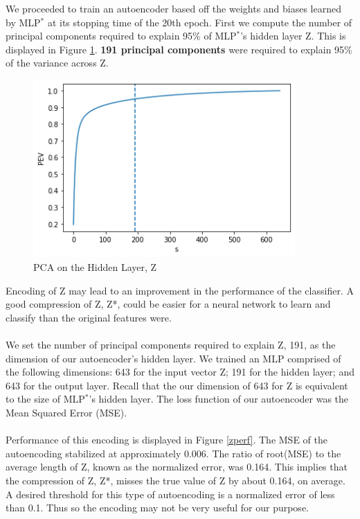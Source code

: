 \documentclass{homework}
\begin{document}
We proceeded to train an autoencoder based off the weights and biases learned by MLP$^*$ at its stopping time of the 20th epoch. First we compute the number of principal components required to explain 95\% of MLP$^*$'s hidden layer Z. This is displayed in Figure \ref{z_pca}. \textbf{191 principal components} were required to explain 95\% of the variance across Z. 

\begin{figure}[H]
    \centering
    \includegraphics[width=10cm]{zpca.png}
    \caption{PCA on the Hidden Layer, Z}
    \label{z_pca}
\end{figure}

Encoding of Z may lead to an improvement in the performance of the classifier. A good compression of Z, Z*, could be easier for a neural network to learn and classify than the original features were.\\\\
We set the number of principal components required to explain Z, 191, as the dimension of our autoencoder's hidden layer. We trained an MLP comprised of the following dimensions: 643 for the input vector Z; 191 for the hidden layer; and 643 for the output layer. Recall that the our dimension of 643 for Z is equivalent to the size of MLP$^*$'s hidden layer. The loss function of our autoencoder was the Mean Squared Error (MSE).\\\\
Performance of this encoding is displayed in Figure \ref{zperf}. The MSE of the autoencoding stabilized at approximately 0.006. The ratio of root(MSE) to the average length of Z, known as the normalized error, was 0.164. This implies that the compression of Z, Z*, misses the true value of Z by about 0.164, on average. A desired threshold for this type of autoencoding is a normalized error of less than 0.1. Thus so the encoding may not be very useful for our purpose.
\end{document}
